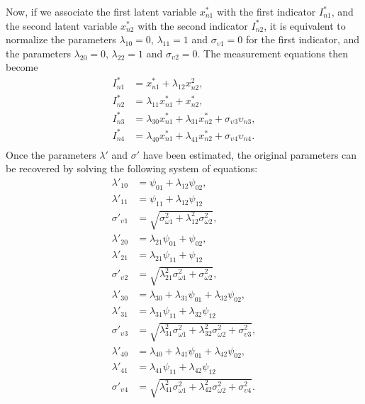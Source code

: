 \documentclass[12pt,a4paper]{article}
\begin{document}
Now, if we associate the first latent variable $x^*_{n1}$ with the first indicator $I^*_{n1}$,
and the second latent variable $x^*_{n2}$ with the second indicator $I^*_{n2}$, it is equivalent to normalize the parameters $\lambda_{10}=0$, $\lambda_{11}=1$ and $\sigma_{\upsilon 1}=0$ for the first indicator, and the parameters $\lambda_{20}=0$, $\lambda_{22}=1$ and $\sigma_{\upsilon 2}=0$.
The measurement equations then become
\[
\begin{aligned}
I^*_{n1} &= x_{n1}^* + \lambda_{12} x_{n2}^2, \\
I^*_{n2} &=\lambda_{11} x_{n1}^* + x_{n2}^*, \\
I^*_{n3} &= \lambda_{30}  x_{n1}^* + \lambda_{31}  x_{n2}^* + \sigma_{\upsilon 3} \upsilon_{n3}, \\
I^*_{n4} &= \lambda_{40}  x_{n1}^* + \lambda_{41}  x_{n2}^* + \sigma_{\upsilon 4} \upsilon_{n4}. \\
\end{aligned}
\]
Once the parameters $\lambda'$ and $\sigma'$ have been estimated, the original parameters can be recovered by solving the following system of equations:
\[
\begin{aligned}
  \lambda'_{10} &=  \psi_{01} + \lambda_{12} \psi_{02}, \\
  \lambda'_{11} &= \psi_{11} + \lambda_{12}\psi_{12} \\
  \sigma'_{\upsilon 1} &= \sqrt{\sigma^2_{\omega 1}+\lambda^2_{12}\sigma^2_{\omega 2}}, \\
  \lambda'_{20} &= \lambda_{21}  \psi_{01} + \psi_{02}, \\
  \lambda'_{21} &= \lambda_{21}\psi_{11} +\psi_{12} \\
  \sigma'_{\upsilon 2} &= \sqrt{\lambda^2_{21}\sigma^2_{\omega 1}+\sigma^2_{\omega 2}}, \\
  \lambda'_{30} &= \lambda_{30} +\lambda_{31}  \psi_{01} + \lambda_{32} \psi_{02}, \\
  \lambda'_{31} &= \lambda_{31}\psi_{11} + \lambda_{32}\psi_{12} \\
  \sigma'_{\upsilon 3} &= \sqrt{\lambda^2_{31}\sigma^2_{\omega 1}+\lambda^2_{32}\sigma^2_{\omega 2}+\sigma^2_{\upsilon 3}}, \\
  \lambda'_{40} &= \lambda_{40} +\lambda_{41}  \psi_{01} + \lambda_{42} \psi_{02}, \\
  \lambda'_{41} &= \lambda_{41}\psi_{11} + \lambda_{42}\psi_{12} \\
  \sigma'_{\upsilon 4} &= \sqrt{\lambda^2_{41}\sigma^2_{\omega 1}+\lambda^2_{42}\sigma^2_{\omega 2}+\sigma^2_{\upsilon 4}}. \\
\end{aligned}
\]


\clearpage


\end{document}
